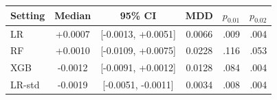 \begin{tabular}{@{}lcccrr@{}}
\toprule
Setting & Median & 95\% CI & MDD & $p_{0.01}$ & $p_{0.02}$ \\
\midrule
LR & +0.0007 & [-0.0013, +0.0051] & 0.0066 & .009 & .004 \\
RF & +0.0010 & [-0.0109, +0.0075] & 0.0228 & .116 & .053 \\
XGB & -0.0012 & [-0.0091, +0.0012] & 0.0128 & .084 & .004 \\
LR-std & -0.0019 & [-0.0051, -0.0011] & 0.0034 & .008 & .004 \\
\bottomrule
\end{tabular}